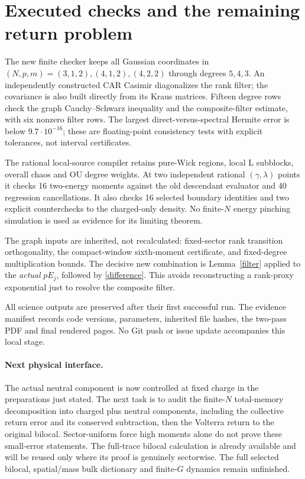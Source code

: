 \documentclass[11pt]{article}
\begin{document}
\newpage
\section{Executed checks and the remaining return problem}
The new finite checker keeps all Gaussian coordinates in
$(N,p,m)=(3,1,2),(4,1,2),(4,2,2)$ through degrees $5,4,3$.
An independently constructed CAR Casimir diagonalizes the rank filter;
the covariance is also built directly from its Kraus matrices.
Fifteen degree rows check the graph Cauchy--Schwarz inequality and
the composite-filter estimate, with six nonzero filter rows.
The largest direct-versus-spectral Hermite error is below
$9.7\cdot10^{-16}$; these are floating-point consistency tests with
explicit tolerances, not interval certificates.

The rational local-source compiler retains pure-Wick regions, local
L subblocks, overall chaos and OU degree weights. At two independent
rational $(\gamma,\lambda)$ points it checks 16 two-energy moments
against the old descendant evaluator and 40 regression cancellations.
It also checks 16 selected boundary identities and two explicit
counterchecks to the charged-only density. No finite-$N$ energy
pinching simulation is used as evidence for its limiting theorem.

The graph inputs are inherited, not recalculated: fixed-sector
rank transition orthogonality, the compact-window sixth-moment
certificate, and fixed-degree multiplication bounds. The decisive
new combination is Lemma~\ref{filter} applied to the \emph{actual}
$pE_j$, followed by \eqref{difference}. This avoids reconstructing a
rank-proxy exponential just to resolve the composite filter.

All science outputs are preserved after their first successful run.
The evidence manifest records code versions, parameters, inherited
file hashes, the two-pass PDF and final rendered pages. No Git push
or issue update accompanies this local stage.

\paragraph{Next physical interface.}
The actual neutral component is now controlled at fixed charge in
the preparations just stated. The next task is to audit the finite-$N$
total-memory decomposition into charged plus neutral components,
including the collective return error and its conserved subtraction,
then the Volterra return to the original bilocal. Sector-uniform force
high moments alone do not prove these small-error statements.
The full-trace bilocal calculation is already available and will be
reused only where its proof is genuinely sectorwise. The full selected
bilocal, spatial/mass bulk dictionary and finite-$G$ dynamics remain
unfinished.
\end{document}
